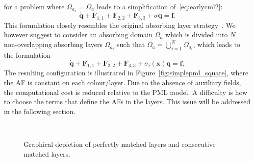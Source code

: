 \documentclass[a4paper]{article}
\renewcommand{\vec}{\boldsymbol}
\begin{document}
for a problem where $\Omega_{a_1} = \Omega_a$ leads to a
simplification of~\eqref{eq:earlycml2}:
\begin{equation}
  \Dot{\vec{q}} + \vec{F}_{1,1} + \vec{F}_{2,2} + \vec{F}_{3,3} +
  \sigma \vec{q} = \vec{f}.
\end{equation}
This formulation closely resembles the original absorbing layer
strategy~\citep{holland83williams}.  We however suggest to consider an
absorbing domain $\Omega_a$ which is divided into $N$ non-overlapping
absorbing layers $\Omega_{a_i}$ such that $\Omega_a = \bigcup_{i=1}^N
\Omega_{a_i}$, which leads to the formulation
\begin{equation}
  \Dot{\vec{q}} + \vec{F}_{1,1} + \vec{F}_{2,2} + \vec{F}_{3,3}
  + \sigma_{i}(\vec{x}) \vec{q}
  = \vec{f},
  \label{eq:cmlaf}
\end{equation}
The resulting configuration is illustrated in
Figure~\ref{fig:simplepml_square}, where the AF is constant on each
colour/layer. Due to the absence of auxiliary fields, the
computational cost is reduced relative to the PML model. A difficulty
is how to choose the terms that define the AFs in the layers. This
issue will be addressed in the following section.

\begin{figure}
  \centering
  \hfill
  \\
  \hfill
  \caption{Graphical depiction of perfectly matched layers and
    consecutive matched layers.}
\end{figure}
\end{document}
